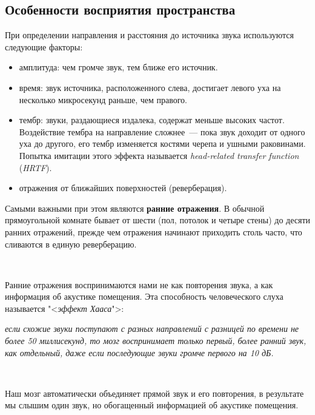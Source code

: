 \documentclass{beamer}
\begin{document}
\subsection{Особенности восприятия пространства}
\begin{frame}
  При определении направления и расстояния до источника звука используются следующие факторы:
  \begin{itemize}
    \item амплитуда: чем громче звук, тем ближе его источник.
    \item время: звук источника, расположенного слева, достигает левого уха на несколько микросекунд раньше, чем правого. 
    \item тембр: звуки, раздающиеся издалека, содержат меньше высоких частот. Воздействие тембра на направление сложнее~--- пока звук доходит от одного уха до другого, его тембр изменяется костями черепа и ушными раковинами. Попытка имитации этого эффекта называется \emph{head-related transfer function} (\emph{HRTF}).
    \item отражения от ближайших поверхностей (реверберация).
  \end{itemize}
\end{frame}

\begin{frame}
  Самыми важными при этом являются \textbf{ранние отражения}. В обычной прямоугольной комнате бывает от шести (пол, потолок и четыре стены) до десяти ранних отражений, прежде чем отражения начинают приходить столь часто, что сливаются в единую реверберацию.
  
  ~
  
 Ранние отражения воспринимаются нами не как повторения звука, а как информация об акустике помещения. Эта способность человеческого слуха называется "<\emph{эффект Хааса}">:
 
 \emph{если схожие звуки поступают с разных направлений с разницей по времени не более 50 миллисекунд, то мозг воспринимает только первый, более ранний звук, как отдельный, даже если последующие звуки громче первого на 10 дБ.}
 
 ~
 
 Наш мозг автоматически объединяет прямой звук и его повторения, в результате мы слышим один звук, но обогащенный информацией об акустике помещения.
\end{frame}
\end{document}
